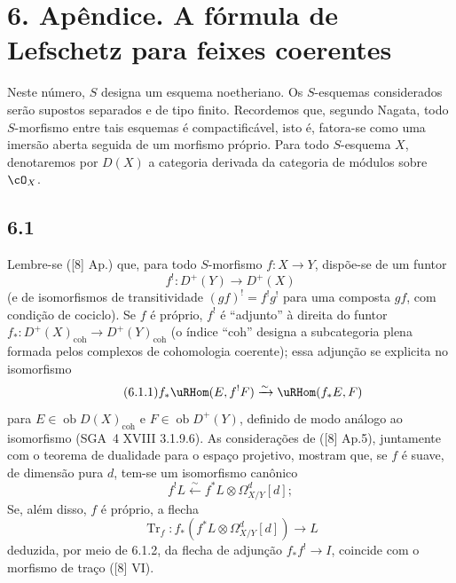 \section*{6. Apêndice. A fórmula de Lefschetz para feixes coerentes}

Neste número, $S$ designa um esquema noetheriano. Os $S$-esquemas considerados serão supostos separados e de tipo finito. Recordemos que, segundo Nagata, todo $S$-morfismo entre tais esquemas é compactificável, isto é, fatora-se como uma imersão aberta seguida de um morfismo próprio. Para todo $S$-esquema $X$, denotaremos por $D(X)$ a categoria derivada da categoria de módulos sobre $\cO_X$.

\subsection*{6.1}
Lembre-se ([8] Ap.) que, para todo $S$-morfismo $f:X\to Y$, dispõe-se de um funtor
\[
f^!:D^+(Y)\longrightarrow D^+(X)
\]
(e de isomorfismos de transitividade $(gf)^! = f^!g^!$ para uma composta $gf$, com condição de cociclo). Se $f$ é próprio, $f^!$ é ``adjunto'' à direita do funtor $f_*:D^+(X)_{\mathrm{coh}}\to D^+(Y)_{\mathrm{coh}}$ (o índice ``coh'' designa a subcategoria plena formada pelos complexos de cohomologia coerente); essa adjunção se explicita no isomorfismo
\begin{equation}
\tag{6.1.1}
f_*\uRHom(E,f^!F)\xrightarrow{\sim}\uRHom(f_*E,F)
\end{equation}
para $E\in\operatorname{ob}D(X)_{\mathrm{coh}}$ e $F\in\operatorname{ob}D^+(Y)$, definido de modo análogo ao isomorfismo (SGA~4 XVIII 3.1.9.6). As considerações de ([8] Ap.5), juntamente com o teorema de dualidade para o espaço projetivo, mostram que, se $f$ é suave, de dimensão pura $d$, tem-se um isomorfismo canônico
\begin{equation}
\tag{6.1.2}
f^!L\xleftarrow{\sim} f^*L\otimes\Omega^d_{X/Y}[d];
\end{equation}
Se, além disso, $f$ é próprio, a flecha
\begin{equation}
\tag{6.1.3}
\operatorname{Tr}_f:f_*(f^*L\otimes\Omega^d_{X/Y}[d])\longrightarrow L
\end{equation}
deduzida, por meio de 6.1.2, da flecha de adjunção $f_*f^!\to I$, coincide com o morfismo de traço ([8] VI).

